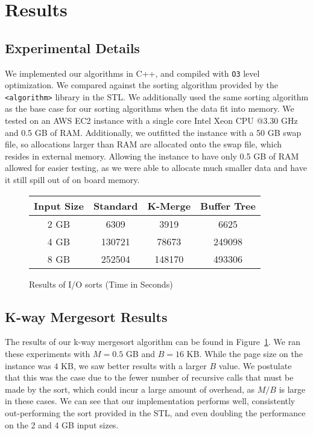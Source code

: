 \documentclass{article}
\begin{document}
\section{Results}

\subsection{Experimental Details}
We implemented our algorithms in C++, and compiled with \texttt{O3} level
optimization.
%
We compared against the sorting algorithm provided by the
\texttt{<algorithm>} library in the STL.
%
We additionally used the same sorting algorithm as the base case for our
sorting algorithms when the data fit into memory.
%
We tested on an AWS EC2 instance with a single core Intel Xeon CPU @3.30 GHz and 0.5 GB of RAM.
%
Additionally, we outfitted the instance with a 50 GB swap file, so allocations
larger than RAM are allocated onto the swap file, which resides in external memory.
%
Allowing the instance to have only 0.5 GB of RAM allowed for easier testing,
as we were able to allocate much smaller data and have it still spill out of
on board memory.

\begin{figure}
  \centering
  \begin{tabular}{|c|c|c|c|}
    \hline
    Input Size & Standard & K-Merge & Buffer Tree \\
    \hline
    \hline
    2 GB & 6309 & 3919 & 6625 \\
    \hline
    4 GB & 130721 & 78673 & 249098 \\ 
    \hline
    8 GB & 252504 & 148170 & 493306 \\
    \hline
  \end{tabular}
  \caption{Results of I/O sorts (Time in Seconds)}
  \label{res}
\end{figure}

\subsection{K-way Mergesort Results}


The results of our k-way mergesort algorithm can be found in Figure~\ref{res}.
%
We ran these experiments with $M = 0.5$ GB and $B = 16$ KB.
%
While the page size on the instance was $4$ KB, we saw better results with a larger $B$
value.
%
We postulate that this was the case due to the fewer number of recursive calls that must be
made by the sort, which could incur a large amount of overhead, as $M/B$ is large in these cases.
%
We can see that our implementation performs well, consistently out-performing the sort
provided in the STL, and even doubling the performance on the 2 and 4 GB input sizes.
%
\end{document}
